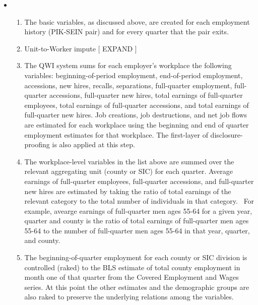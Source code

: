 \begin{itemize}
\item[\ ] 

\begin{enumerate}
\item The basic variables, as discussed above, are created for each
employment history (PIK-SEIN pair) and for every quarter
that the pair exits.

\item Unit-to-Worker impute 
%
%
  [ EXPAND ]
%
%

\item The QWI system sums for each employer's workplace the following variables:
beginning-of-period employment, end-of-period employment, accessions, new
hires, recalls, separations, full-quarter employment, full-quarter
accessions, full-quarter new hires, total earnings of full-quarter
employees, total earnings of full-quarter accessions, and total earnings of
full-quarter new hires. Job creations, job destructions, and net job flows
are estimated for each workplace using the beginning and end of quarter
employment estimates for that workplace. The first-layer of
disclosure-proofing is also applied at this step.

\item The workplace-level variables in the list above are summed over the
relevant aggregating unit (county or SIC) for each quarter. Average
earnings of full-quarter employees, full-quarter accessions, and
full-quarter new hires are estimated by taking the ratio of total earnings
of the relevant category to the total number of individuals in that
category. \ For example, avearge earnings of full-quarter men ages 55-64 for
a given year, quarter and county is the ratio of total earnings of
full-quarter men ages 55-64 to the number of full-quarter men ages 55-64 in
that year, quarter, and county.

\item The beginning-of-quarter employment for each county or SIC division is
controlled (raked) to the BLS estimate of total county employment in month
one of that quarter from the Covered Employment and Wages series. At this
point the other estimates and the demographic groups are also raked to
preserve the underlying relations among the variables.
\end{enumerate}
\end{itemize}

%
%
%

